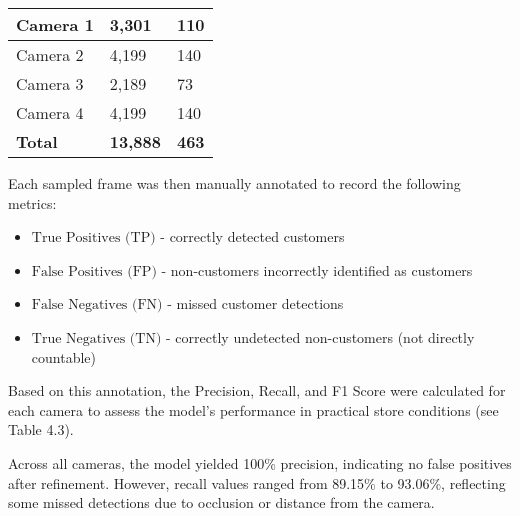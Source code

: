 {{\begin{longtable}{|p{4cm}|p{5cm}|p{5cm}|}
		\hline
		\endlastfoot
		
		Camera 1 & 3,301 & 110 \\
		\hline
		Camera 2 & 4,199 & 140 \\
		\hline
		Camera 3 & 2,189 & 73 \\
		\hline
		Camera 4 & 4,199 & 140 \\
		\hline
		\textbf{Total} & \textbf{13,888} & \textbf{463} \\
		\hline
		
	\end{longtable}
}


Each sampled frame was then manually annotated to record the following metrics:

\noindent
\begin{itemize}
	\item $\text{True Positives (TP)}$ - correctly detected customers
	\item $\text{False Positives (FP)}$ - non-customers incorrectly identified as customers
	\item $\text{False Negatives (FN)}$ - missed customer detections
	\item $\text{True Negatives (TN)}$ - correctly undetected non-customers (not directly countable)
\end{itemize}

Based on this annotation, the Precision, Recall, and F1 Score were calculated for each camera to assess the model’s performance in practical store conditions (see Table 4.3).

Across all cameras, the model yielded 100\% precision, indicating no false positives after refinement. However, recall values ranged from 89.15\% to 93.06\%, reflecting some missed detections due to occlusion or distance from the camera.

}
